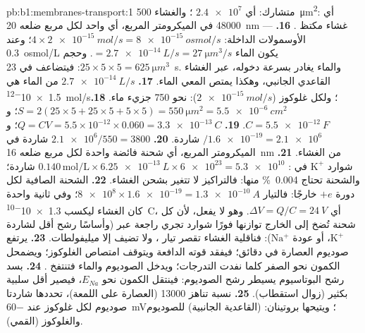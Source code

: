 \begin{solution}{pb:b1:membranes-transport:1}
{متشارك}: أي $\num{2.4e7}$ ؛ والغشاء \qty{500}{\micro m^2}:
أي \num{48000}  في الميكرومتر المربع، أي واحد لكل مربع ضلعه
\qty{20}{nm} --- غشاء مكتظ .
\textbf{16.} الأوسمولات الداخلة: $4\times\qty{2e-15}{mol/s} =
\qty{8e-15}{osmol/s}$؛ وعند \qty{0.3}{osmol/L} يكون الماء
$= \qty{2.7e-14}{L/s} = \qty{27}{\micro m^3/s}$. وحجم 
$25\times 5\times 5 = \qty{625}{\micro m^3}$: فيتضاعف في
\qty{23}{s}. والماء يغادر بسرعة دخوله، عبر الغشاء القاعدي الجانبي،
وهكذا يمتص المعي الماء.
\textbf{17.} $\qty{2.7e-14}{L/s}$ من الماء هي \qty{1.5e-12}{mol/s}؛ ولكل غلوكوز ($\qty{2e-15}{mol/s}$): نحو 750 جزيء ماء.
\textbf{18.} $S = 2(25\times 5 + 25\times 5 + 5\times 5) =
\qty{550}{\micro m^2} = \qty{5.5e-6}{cm^2}$؛ و$C = \qty{5.5e-12}{F}$.
\textbf{19.} $Q = CV = 5.5\times 10^{-12}\times 0.060 =
\qty{3.3e-13}{C}$؛ و$/\num{1.6e-19} = \num{2.1e6}$ شاردة.
\textbf{20.} $\num{2.1e6}/550 = 3800$ شاردة في الميكرومتر المربع، أي شحنة فائضة واحدة لكل مربع ضلعه \qty{16}{nm} من الغشاء.
\textbf{21.} شوارد $\mathrm{K^+}$ في :
$0.140\,\mathrm{mol/L}\times
\qty{6.25e-13}{L}\times\num{6e23} = \num{5.3e10}$ شاردة؛ والشحنة تحتاج \qty{0.004}{\%} منها: فالتراكيز
لا تتغير بشحن الغشاء.
\textbf{22.} الشحنة الصافية لكل دورة $+e$ خارجًا: فالتيار
$\num{8e8}\times
\num{1.6e-19} = \qty{1.3e-10}{A}$؛ وفي ثانية واحدة
كان الغشاء ليكسب \qty{1.3e-10}{C}، أي
$\Delta V = Q/C = \qty{24}{V}$. وهو لا يفعل، لأن كل شحنة تُضخ إلى
الخارج توازنها فورًا شوارد تجري راجعة عبر  (وأساسًا رشح أقل
لشاردة $\mathrm{K^+}$، أو عودة $\mathrm{Na^+}$): فناقلية الغشاء تقصر
تيار ، ولا تضيف  إلا ميليفولطات.
\textbf{23.} يرتفع صوديوم العصارة في دقائق؛ فيفقد 
قوته الدافعة ويتوقف امتصاص الغلوكوز؛ ويضمحل الكمون نحو الصفر كلما
نفدت التدرجات؛ ويدخل الصوديوم والماء فتنتفخ .
\textbf{24.} بسد رشح البوتاسيوم يسيطر رشح الصوديوم: فينتقل الكمون
نحو $E_{Na}$، فيصير أقل سلبية بكثير (زوال استقطاب).
\textbf{25.} نسبة تناهز \num{13000} (العصارة على اللمعة)، تحددها
شاردتا صوديوم لكل غلوكوز عند \qty{-60}{mV}؛ ويتيحها بروتينان:  (القاعدية الجانبية)  للصوديوم
والغلوكوز (القمي).
\end{solution}

